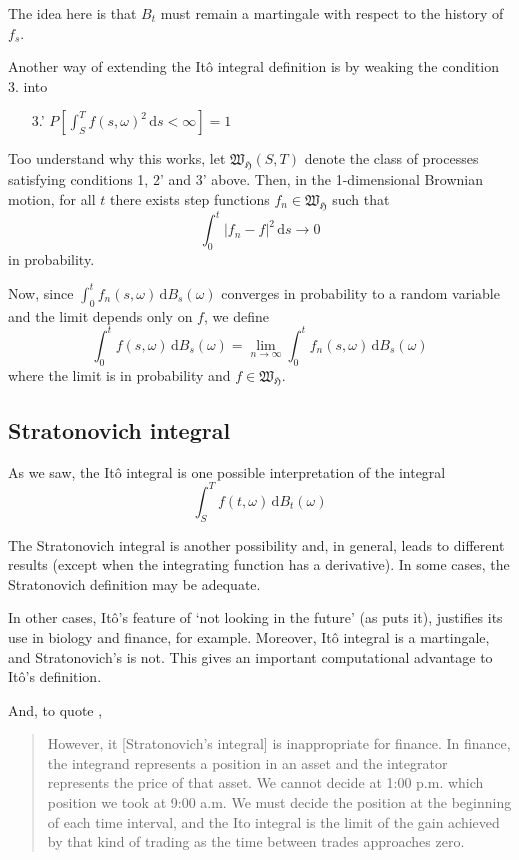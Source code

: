 \documentclass[12pt,a4paper]{article}
\theoremstyle{definition}
\begin{document}
The idea here is that $B_t$ must remain a martingale with respect to the history of $f_s$. 

Another way of extending the Itô integral definition is by weaking the condition 3. into
\begin{itemize}
	\item[3.'] $P \left[ \int_S^T f(s, \omega)^2 \, \mathrm{d}s < \infty \right] = 1$
\end{itemize}

Too understand why this works, let $\mathfrak{W}_{\mathfrak{H}} (S,T)$ denote the class of processes satisfying conditions 1, 2' and 3' above. Then, in the 1-dimensional Brownian motion, for all $t$ there exists step functions $f_n \in \mathfrak{W}_{\mathfrak{H}}$ such that
\[
	\int_0^t |f_n - f|^2 \, \mathrm{d}s \longrightarrow 0
\]
in probability.

Now, since $\int_0^t f_n(s, \omega) \, \mathrm{d}B_s(\omega)$ converges in probability to a random variable and the limit depends only on $f$, we define
\[
	\int_0^t f(s, \omega) \, \mathrm{d}B_s(\omega) = \lim_{n \to \infty} \int_0^t f_n(s, \omega) \, \mathrm{d}B_s(\omega)
\]
where the limit is in probability and $f \in \mathfrak{W}_{\mathfrak{H}}$.

\subsection{Stratonovich integral}

As we saw, the Itô integral is one possible interpretation of the integral 
\[
	\int_S^T f(t, \omega) \, \mathrm{d}B_t(\omega)
\]

The Stratonovich integral is another possibility and, in general, leads to different results (except when the integrating function has a derivative). In some cases, the Stratonovich definition may be adequate.

In other cases, Itô's feature of `not looking in the future' (as \cite{oksendal2013stochastic} puts it), justifies its use in biology and finance, for example. Moreover, Itô integral is a martingale, and Stratonovich's is not. This gives an important computational advantage to Itô's definition. 

And, to quote \cite{shreve2004stochastic},

\begin{quotation}
	However, it [Stratonovich's integral] is inappropriate for finance. In finance, the integrand represents a position in an asset and the integrator represents the price of that asset. We cannot decide at 1:00 p.m. which position we took at 9:00 a.m. We must decide the position at the beginning of each time interval, and the Ito integral is the limit of the gain achieved by that kind of trading as the time between trades approaches zero.
\end{quotation}
\end{document}
